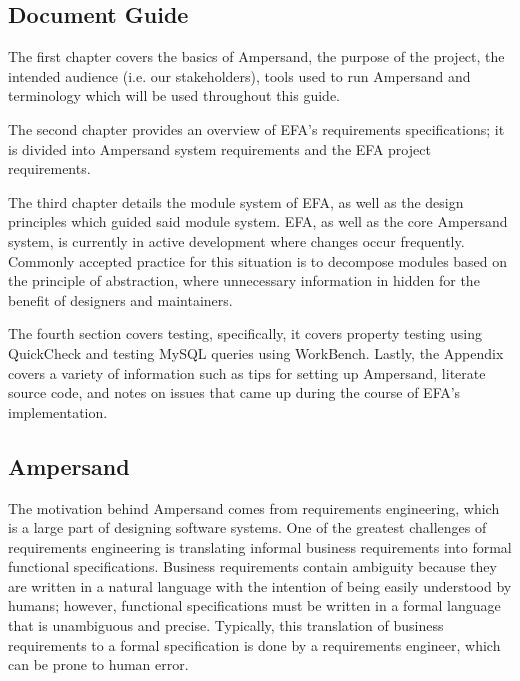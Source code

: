 \documentclass[journal,12pt,onecolumn,draftclsnofoot]{article}
\let\Oldsubsection\subsection
\renewcommand{\subsection}{\FloatBarrier\Oldsubsection}
\begin{document}
\subsection{Document Guide}

The first chapter covers 
the basics of Ampersand, the purpose of the project, the intended audience 
(i.e. our stakeholders), tools used to run Ampersand and terminology which will 
be used throughout this guide. 

The second chapter provides an overview of EFA's requirements specifications; 
it is divided into Ampersand system requirements and the EFA project 
requirements.

The third chapter details the module system of EFA, as well as the design principles
which guided said module system. EFA, as well as the core Ampersand system, is
currently in active development where changes occur frequently. Commonly
accepted practice for this situation is to decompose modules based on the
principle of abstraction, where unnecessary information in hidden for the
benefit of designers and maintainers\citep{modStruct,Parnas1972}.

The fourth section covers testing, specifically, it covers property testing 
using QuickCheck and testing MySQL queries using WorkBench.
Lastly, the Appendix 
covers a variety of information such as tips for setting up 
Ampersand, literate source code, and notes on issues that came up during the 
course of EFA's 
implementation. 

\subsection{Ampersand}


\indent
The motivation behind Ampersand comes from requirements engineering, which is a 
large part of designing software systems. One of the greatest challenges of 
requirements engineering is translating informal business requirements into 
formal functional specifications. Business requirements contain ambiguity 
because they are written in a natural language with the intention of being 
easily understood by humans; however,
functional specifications must be written in a formal language that is 
unambiguous and precise. Typically, this translation of business requirements 
to a formal specification is done by a requirements
engineer, which can be prone to human error.
\end{document}
